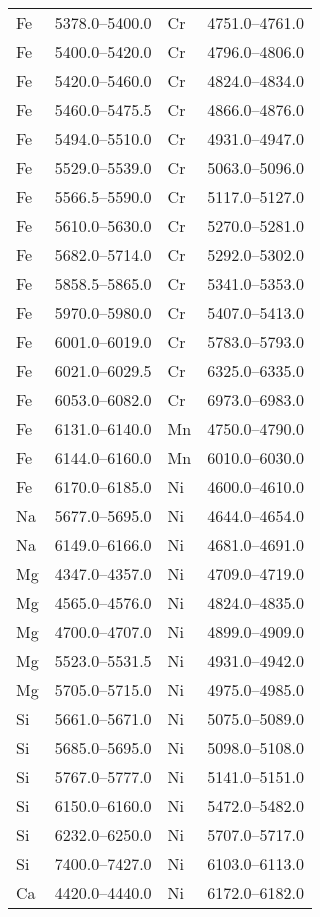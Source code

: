 \documentclass{aa}
\begin{document}
\begin{appendix}
\begin{table}[!h]
\begin{adjustbox}{height=0.45\textheight}
\begin{tabular}{l l l l}
Fe & 5378.0--5400.0 & Cr & 4751.0--4761.0 \\
Fe & 5400.0--5420.0 & Cr & 4796.0--4806.0 \\
Fe & 5420.0--5460.0 & Cr & 4824.0--4834.0 \\
Fe & 5460.0--5475.5 & Cr & 4866.0--4876.0 \\
Fe & 5494.0--5510.0 & Cr & 4931.0--4947.0 \\
Fe & 5529.0--5539.0 & Cr & 5063.0--5096.0 \\
Fe & 5566.5--5590.0 & Cr & 5117.0--5127.0 \\
Fe & 5610.0--5630.0 & Cr & 5270.0--5281.0 \\
Fe & 5682.0--5714.0 & Cr & 5292.0--5302.0 \\
Fe & 5858.5--5865.0 & Cr & 5341.0--5353.0 \\
Fe & 5970.0--5980.0 & Cr & 5407.0--5413.0 \\
Fe & 6001.0--6019.0 & Cr & 5783.0--5793.0 \\
Fe & 6021.0--6029.5 & Cr & 6325.0--6335.0 \\
Fe & 6053.0--6082.0 & Cr & 6973.0--6983.0 \\
Fe & 6131.0--6140.0 & Mn & 4750.0--4790.0 \\
Fe & 6144.0--6160.0 & Mn & 6010.0--6030.0 \\
Fe & 6170.0--6185.0 & Ni & 4600.0--4610.0 \\
Na & 5677.0--5695.0 & Ni & 4644.0--4654.0 \\
Na & 6149.0--6166.0 & Ni & 4681.0--4691.0 \\
Mg & 4347.0--4357.0 & Ni & 4709.0--4719.0 \\
Mg & 4565.0--4576.0 & Ni & 4824.0--4835.0 \\
Mg & 4700.0--4707.0 & Ni & 4899.0--4909.0 \\
Mg & 5523.0--5531.5 & Ni & 4931.0--4942.0 \\
Mg & 5705.0--5715.0 & Ni & 4975.0--4985.0 \\
Si & 5661.0--5671.0 & Ni & 5075.0--5089.0 \\
Si & 5685.0--5695.0 & Ni & 5098.0--5108.0 \\
Si & 5767.0--5777.0 & Ni & 5141.0--5151.0 \\
Si & 6150.0--6160.0 & Ni & 5472.0--5482.0 \\
Si & 6232.0--6250.0 & Ni & 5707.0--5717.0 \\
Si & 7400.0--7427.0 & Ni & 6103.0--6113.0 \\
Ca & 4420.0--4440.0 & Ni & 6172.0--6182.0 \\

\end{tabular}
\end{adjustbox}
\end{table}
\end{appendix}
\end{document}
